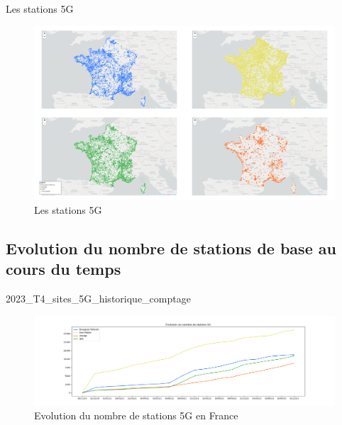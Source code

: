 \begin{frame}{Les stations 5G}
    \begin{figure}
        \includegraphics[width=0.9\paperheight]{images/cartes/providers-site_5g.png}
        \caption{\label{fig:sp-5g}Les stations 5G}
    \end{figure}
\end{frame}


\subsection{Evolution du nombre de stations de base au cours du temps}
\insertsubsectionframe

\begin{frame}{2023\_T4\_sites\_5G\_historique\_comptage}
    \begin{figure}
        \includegraphics[height=0.5\paperheight]{images/5G-evolution.png}
        \caption{\label{fig:5G-ev}Evolution du nombre de stations 5G en France}
    \end{figure}
\end{frame}


